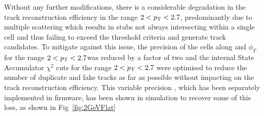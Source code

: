 Without any further modifications, there is a considerable degradation in the track reconstruction efficiency in the range $2 < p_{\mathrm{T}} < 2.7$\GeVc, predominantly due to multiple scattering which results in stubs not always intersecting within a single \HT cell and thus failing to exceed the threshold criteria and generate track candidates.
To mitigate against this issue, the precision of the \HT cells along \qpt and $\phi_{T}$ for the range $2 < p_{\mathrm{T}} < 2.7$\GeVc was reduced by a factor of two and the internal \KF State Accumulator $\chi^2$ cuts for the range $2 < p_{\mathrm{T}} < 2.7$ were optimised to reduce the number of duplicate and fake tracks as far as possible without impacting on the track reconstruction efficiency.
This variable precision \HT, which has been separately implemented in firmware, has been shown in simulation to recover some of this loss, as shown in Fig~\ref{fig:2GeVFlat}

